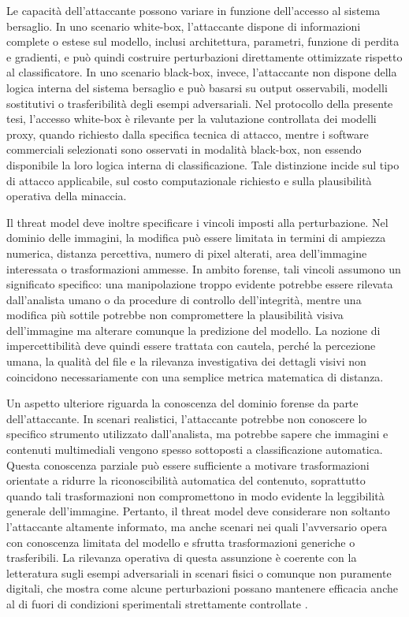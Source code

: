 Le capacità dell'attaccante possono variare in funzione dell'accesso al sistema bersaglio. In uno scenario white-box, l'attaccante dispone di informazioni complete o estese sul modello, inclusi architettura, parametri, funzione di perdita e gradienti, e può quindi costruire perturbazioni direttamente ottimizzate rispetto al classificatore. In uno scenario black-box, invece, l'attaccante non dispone della logica interna del sistema bersaglio e può basarsi su output osservabili, modelli sostitutivi o trasferibilità degli esempi adversariali. Nel protocollo della presente tesi, l'accesso white-box è rilevante per la valutazione controllata dei modelli proxy, quando richiesto dalla specifica tecnica di attacco, mentre i software commerciali selezionati sono osservati in modalità black-box, non essendo disponibile la loro logica interna di classificazione. Tale distinzione incide sul tipo di attacco applicabile, sul costo computazionale richiesto e sulla plausibilità operativa della minaccia.

Il threat model deve inoltre specificare i vincoli imposti alla perturbazione. Nel dominio delle immagini, la modifica può essere limitata in termini di ampiezza numerica, distanza percettiva, numero di pixel alterati, area dell'immagine interessata o trasformazioni ammesse. In ambito forense, tali vincoli assumono un significato specifico: una manipolazione troppo evidente potrebbe essere rilevata dall'analista umano o da procedure di controllo dell'integrità, mentre una modifica più sottile potrebbe non compromettere la plausibilità visiva dell'immagine ma alterare comunque la predizione del modello. La nozione di impercettibilità deve quindi essere trattata con cautela, perché la percezione umana, la qualità del file e la rilevanza investigativa dei dettagli visivi non coincidono necessariamente con una semplice metrica matematica di distanza.

Un aspetto ulteriore riguarda la conoscenza del dominio forense da parte dell'attaccante. In scenari realistici, l'attaccante potrebbe non conoscere lo specifico strumento utilizzato dall'analista, ma potrebbe sapere che immagini e contenuti multimediali vengono spesso sottoposti a classificazione automatica. Questa conoscenza parziale può essere sufficiente a motivare trasformazioni orientate a ridurre la riconoscibilità automatica del contenuto, soprattutto quando tali trasformazioni non compromettono in modo evidente la leggibilità generale dell'immagine. Pertanto, il threat model deve considerare non soltanto l'attaccante altamente informato, ma anche scenari nei quali l'avversario opera con conoscenza limitata del modello e sfrutta trasformazioni generiche o trasferibili. La rilevanza operativa di questa assunzione è coerente con la letteratura sugli esempi adversariali in scenari fisici o comunque non puramente digitali, che mostra come alcune perturbazioni possano mantenere efficacia anche al di fuori di condizioni sperimentali strettamente controllate \cite{kurakin2017physical}.

